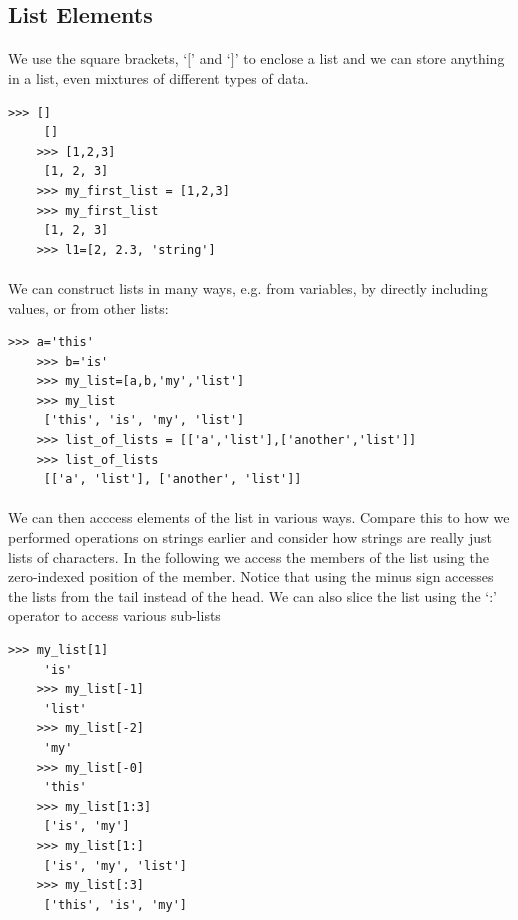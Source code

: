\documentclass[12pt, a4paper, oneside]{book}
\begin{document}
\subsection{List Elements}
\paragraph{} We use the square brackets, `$[$' and `$]$' to enclose a list and we can store anything in a list, even mixtures of different types of data.

\begin{lstlisting}[style=DOS]
    >>> []
     []
    >>> [1,2,3]
     [1, 2, 3]
    >>> my_first_list = [1,2,3]
    >>> my_first_list
     [1, 2, 3]
    >>> l1=[2, 2.3, 'string']
\end{lstlisting}

\paragraph{} We can construct lists in many ways, e.g. from variables, by directly including values, or from other lists:
\begin{lstlisting}[style=DOS]
    >>> a='this'
    >>> b='is'
    >>> my_list=[a,b,'my','list']
    >>> my_list
     ['this', 'is', 'my', 'list']
    >>> list_of_lists = [['a','list'],['another','list']]
    >>> list_of_lists
     [['a', 'list'], ['another', 'list']]
\end{lstlisting}

\paragraph{} We can then acccess elements of the list in various ways. Compare this to how we performed operations on strings earlier and consider how strings are really just lists of characters. In the following we access the members of the list using the zero-indexed position of the member. Notice that using the minus sign accesses the lists from the tail instead of the head. We can also slice the list using the `:' operator to access various sub-lists

\begin{lstlisting}[style=DOS]
    >>> my_list[1]
     'is'
    >>> my_list[-1]
     'list'
    >>> my_list[-2]
     'my'
    >>> my_list[-0]
     'this'
    >>> my_list[1:3]
     ['is', 'my']
    >>> my_list[1:]
     ['is', 'my', 'list']
    >>> my_list[:3]
     ['this', 'is', 'my']
\end{lstlisting}
\end{document}
